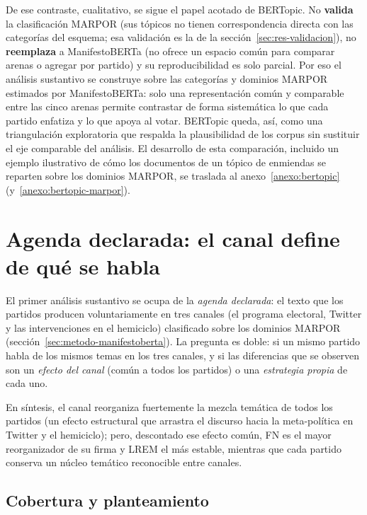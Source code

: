 De ese contraste, cualitativo, se sigue el papel acotado de BERTopic. No
\textbf{valida} la clasificación MARPOR (sus tópicos no tienen correspondencia
directa con las categorías del esquema; esa validación es la de la
sección~\ref{sec:res-validacion}), no \textbf{reemplaza} a ManifestoBERTa (no
ofrece un espacio común para comparar arenas o agregar por partido) y su
reproducibilidad es solo parcial. Por eso el análisis sustantivo se construye
sobre las categorías y dominios MARPOR estimados por ManifestoBERTa: solo una
representación común y comparable entre las cinco arenas permite contrastar de
forma sistemática lo que cada partido enfatiza y lo que apoya al votar. BERTopic
queda, así, como una triangulación exploratoria que respalda la plausibilidad de
los corpus sin sustituir el eje comparable del análisis. El desarrollo de esta
comparación, incluido un ejemplo ilustrativo de cómo los documentos de un tópico
de enmiendas se reparten sobre los dominios MARPOR, se traslada al
anexo~\ref{anexo:bertopic} (y~\ref{anexo:bertopic-marpor}).

\section{Agenda declarada: el canal define de qué se habla}
\label{sec:res-declarada}

El primer análisis sustantivo se ocupa de la \emph{agenda declarada}: el texto
que los partidos producen voluntariamente en tres canales (el programa
electoral, Twitter y las intervenciones en el hemiciclo) clasificado sobre los
dominios MARPOR (sección~\ref{sec:metodo-manifestoberta}). La pregunta es doble:
si un mismo partido habla de los mismos temas en los tres canales, y si las
diferencias que se observen son un \emph{efecto del canal} (común a todos los
partidos) o una \emph{estrategia propia} de cada uno.

En síntesis, el canal reorganiza fuertemente la mezcla temática de todos los
partidos (un efecto estructural que arrastra el discurso hacia la meta-política
en Twitter y el hemiciclo); pero, descontado ese efecto común, FN es el mayor
reorganizador de su firma y LREM el más estable, mientras que cada partido
conserva un núcleo temático reconocible entre canales.

\subsection{Cobertura y planteamiento}
\label{sec:res-declarada-cobertura}

